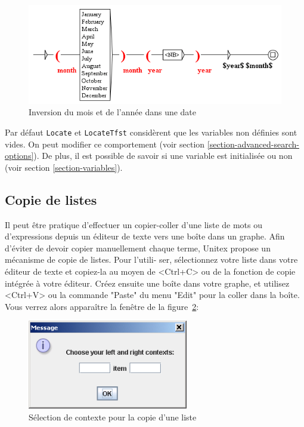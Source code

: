 \bigskip
\begin{figure}[h]
\begin{center}
\includegraphics[width=14.5cm]{resources/img/fig5-17.png}
\caption{Inversion du mois et de l’année dans une date\label{fig-date-grammar}}
\end{center}
\end{figure}


\bigskip
\noindent Par défaut \verb+Locate+ et \verb+LocateTfst+ considèrent que les variables non définies
sont vides. On peut modifier ce comportement (voir section \ref{section-advanced-search-options}).
De plus, il est  possible de savoir si une variable est initialisée ou non (voir section
\ref{section-variables}).

\subsection{Copie de listes}

Il peut être pratique d’effectuer un copier-coller d’une liste de mots ou d’expressions
depuis un éditeur de texte vers une boîte dans un graphe. Afin d’éviter de devoir copier
manuellement chaque terme, Unitex propose un mécanisme de copie de listes. Pour l’utili-
ser, sélectionnez votre liste dans votre éditeur de texte et copiez-la au moyen de <Ctrl+C> ou
de la fonction de copie intégrée à votre éditeur. Créez ensuite une boîte dans votre graphe,
et utilisez <Ctrl+V> ou la commande "Paste" du menu "Edit" pour la coller dans la boîte.
Vous verrez alors apparaître la fenêtre de la figure~\ref{fig-setting-contexts-for-multiple-copy}:

\bigskip
\begin{figure}[h]
\begin{center}
\includegraphics[width=7cm]{resources/img/fig5-18.png}
\caption{Sélection de contexte pour la copie d’une
liste\label{fig-setting-contexts-for-multiple-copy}}
\end{center}
\end{figure}

